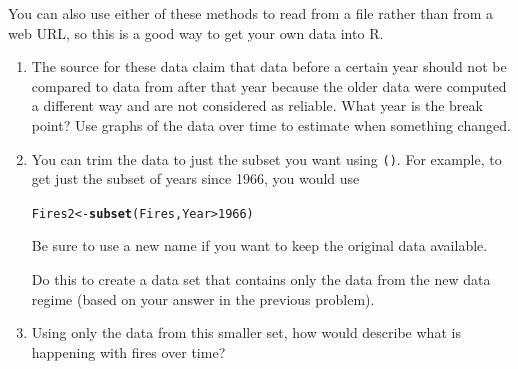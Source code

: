 \documentclass[twoside]{book}\usepackage[]{graphicx}\usepackage[]{xcolor}
\makeatletter
\newcommand{\hlnum}[1]{\textcolor[rgb]{0.686,0.059,0.569}{#1}}%
\newcommand{\hlopt}[1]{\textcolor[rgb]{0,0,0}{#1}}%
\newcommand{\hlstd}[1]{\textcolor[rgb]{0.345,0.345,0.345}{#1}}%
\newcommand{\hlkwb}[1]{\textcolor[rgb]{0.69,0.353,0.396}{#1}}%
\newcommand{\hlkwd}[1]{\textcolor[rgb]{0.737,0.353,0.396}{\textbf{#1}}}%
\newenvironment{kframe}{%
 \def\at@end@of@kframe{}%
 \ifinner\ifhmode%
  \def\at@end@of@kframe{\end{minipage}}%
  \begin{minipage}{\columnwidth}%
 \fi\fi%
 \def\FrameCommand##1{\hskip\@totalleftmargin \hskip-\fboxsep
 \colorbox{shadecolor}{##1}\hskip-\fboxsep
     \hskip-\linewidth \hskip-\@totalleftmargin \hskip\columnwidth}%
 \MakeFramed {\advance\hsize-\width
   \@totalleftmargin\z@ \linewidth\hsize
   \@setminipage}}%
 {\par\unskip\endMakeFramed%
 \at@end@of@kframe}
\newenvironment{knitrout}{}{} %
\newcommand{\Rindex}[1]{\index{\texttt{#1}}}
\newcommand{\function}[1]{{\color{purple!75!blue}\texttt{\StrSubstitute{#1}{()}{}()}}\Rindex{#1}}
\def\R{{\sf R}}
\newcounter{example}[section]
\makeatother
\begin{document}
\begin{problem}
\begin{itemize}
\begin{knitrout}
\begin{kframe}
{\ttfamily\noindent\itshape\color{messagecolor}{\#\# \\\#\# -- Column specification ------------------------------------------------------------------\\\#\# cols(\\\#\#\ \  Year = col\_double(),\\\#\#\ \  Fires = col\_double(),\\\#\#\ \  Acres = col\_double()\\\#\# )}}\end{kframe}
\end{knitrout}
\end{itemize}
You can also use either of these methods to read from a file rather than from a
web URL, so this is a good way to get your own data into \R.
\begin{enumerate}
	\item
		The source for these data claim that data before a certain year should not be compared
		to data from after that year because the older data were computed a different way and
		are not considered as reliable.  What year is the break point?  Use graphs of the data 
		over time to estimate when something changed.
	\item
		You can trim the data to just the subset you want using \function{subset()}.  For 
		example, to get just the subset of years since 1966, you would use
\begin{knitrout}
\color{fgcolor}\begin{kframe}
\begin{alltt}
\hlstd{Fires2} \hlkwb{<-} \hlkwd{subset}\hlstd{(Fires, Year} \hlopt{>} \hlnum{1966}\hlstd{)}
\end{alltt}
\end{kframe}
\end{knitrout}
		Be sure to use a new name if you want to keep the original data available.

		Do this to create a data set that contains only the data from the new data regime (based on your answer in the previous problem).
	\item
		Using only the data from this smaller set, how would describe what is happening with 
		fires over time?
\end{enumerate}
\end{problem}
\end{document}
